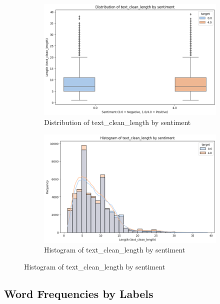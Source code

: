 \begin{figure}[H]
    \centering
    \begin{subfigure}[b]{0.48\textwidth}
        \includegraphics[width=\textwidth]{img/visualize_pic/text_clean.png}
    \caption{Distribution of text\_clean\_length by sentiment}
    \end{subfigure}
    \begin{subfigure}[b]{0.48\textwidth}
         \includegraphics[width=\textwidth]{img/visualize_pic/text_clean_histogram.png}
    \caption{Histogram of text\_clean\_length by sentiment}
    \end{subfigure}
\end{figure}

\subsection{Word Frequencies by Labels}

